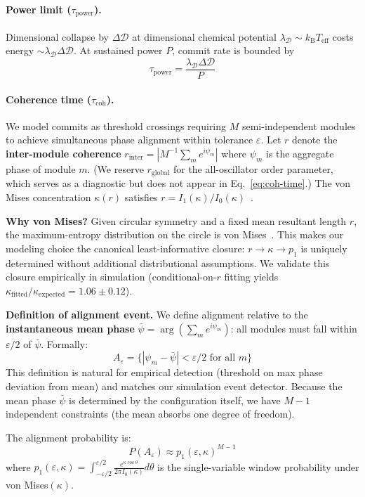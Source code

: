 \documentclass[12pt]{article}
\newcommand{\kB}{k_{\mathrm{B}}}
\newcommand{\Teff}{T_{\mathrm{eff}}}
\begin{document}
\paragraph{Power limit ($\tau_{\mathrm{power}}$).} Dimensional collapse by $\Delta\mathcal{D}$ at dimensional chemical potential $\lambda_{\mathcal{D}} \sim \kB\Teff$ costs energy $\sim \lambda_{\mathcal{D}}\Delta\mathcal{D}$. At sustained power $P$, commit rate is bounded by
\[
\tau_{\mathrm{power}} = \frac{\lambda_{\mathcal{D}}\Delta\mathcal{D}}{P}
\]

\paragraph{Coherence time ($\tau_{\mathrm{coh}}$).}
We model commits as threshold crossings requiring $M$ semi-independent modules to achieve simultaneous phase alignment within tolerance $\varepsilon$.
Let $r$ denote the \textbf{inter-module coherence} $r_{\mathrm{inter}} = |M^{-1}\sum_m e^{i\psi_m}|$ where $\psi_m$ is the aggregate phase of module $m$. (We reserve $r_{\mathrm{global}}$ for the all-oscillator order parameter, which serves as a diagnostic but does not appear in Eq.~\ref{eq:coh-time}.) The von Mises concentration $\kappa(r)$ satisfies $r=I_1(\kappa)/I_0(\kappa)$~\cite{mardia2000}.

\textbf{Why von Mises?} Given circular symmetry and a fixed mean resultant length $r$, the maximum-entropy distribution on the circle is von Mises~\cite{mardia2000}. This makes our modeling choice the canonical least-informative closure: $r \to \kappa \to p_1$ is uniquely determined without additional distributional assumptions. We validate this closure empirically in simulation (conditional-on-$r$ fitting yields $\kappa_{\mathrm{fitted}}/\kappa_{\mathrm{expected}} = 1.06 \pm 0.12$).

\textbf{Definition of alignment event.} We define alignment relative to the \textbf{instantaneous mean phase} $\bar{\psi} = \arg(\sum_m e^{i\psi_m})$: all modules must fall within $\varepsilon/2$ of $\bar{\psi}$. Formally:
\[
A_\varepsilon = \{|\psi_m - \bar{\psi}| < \varepsilon/2 \text{ for all } m\}
\]
This definition is natural for empirical detection (threshold on max phase deviation from mean) and matches our simulation event detector. Because the mean phase $\bar{\psi}$ is determined by the configuration itself, we have $M-1$ independent constraints (the mean absorbs one degree of freedom).

The alignment probability is:
\[
P(A_\varepsilon) \approx p_1(\varepsilon, \kappa)^{M-1}
\]
where $p_1(\varepsilon, \kappa) = \int_{-\varepsilon/2}^{\varepsilon/2} \frac{e^{\kappa\cos\theta}}{2\pi I_0(\kappa)} d\theta$ is the single-variable window probability under von Mises$(\kappa)$.
\end{document}
